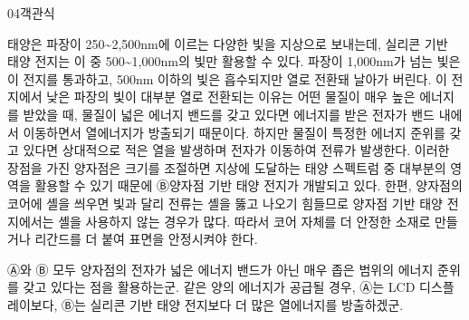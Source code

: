 \documentclass[fs85,seriesWit]{korfarm-base}
\begin{document}
\begin{kfQBlock}{04}{객관식}
\begin{kfEvidence}태양은 파장이 250\textasciitilde{}2,500nm에 이르는 다양한 빛을 지상으로 보내는데, 실리콘 기반 태양 전지는 이 중 500\textasciitilde{}1,000nm의 빛만 활용할 수 있다. 파장이 1,000nm가 넘는 빛은 이 전지를 통과하고, 500nm 이하의 빛은 흡수되지만 열로 전환돼 날아가 버린다. 이 전지에서 낮은 파장의 빛이 대부분 열로 전환되는 이유는 어떤 물질이 매우 높은 에너지를 받았을 때, 물질이 넓은 에너지 밴드를 갖고 있다면 에너지를 받은 전자가 밴드 내에서 이동하면서 열에너지가 방출되기 때문이다. 하지만 물질이 특정한 에너지 준위를 갖고 있다면 상대적으로 적은 열을 발생하며 전자가 이동하여 전류가 발생한다. 이러한 장점을 가진 양자점은 크기를 조절하면 지상에 도달하는 태양 스펙트럼 중 대부분의 영역을 활용할 수 있기 때문에 Ⓑ양자점 기반 태양 전지가 개발되고 있다. 한편, 양자점의 코어에 셸을 씌우면 빛과 달리 전류는 셸을 뚫고 나오기 힘들므로 양자점 기반 태양 전지에서는 셸을 사용하지 않는 경우가 많다. 따라서 코어 자체를 더 안정한 소재로 만들거나 리간드를 더 붙여 표면을 안정시켜야 한다.\end{kfEvidence}
\begin{kfChoices}
\kfChoice Ⓐ와 Ⓑ 모두 양자점의 전자가 넓은 에너지 밴드가 아닌 매우 좁은 범위의 에너지 준위를 갖고 있다는 점을 활용하는군.
\kfChoice 같은 양의 에너지가 공급될 경우, Ⓐ는 LCD 디스플레이보다, Ⓑ는 실리콘 기반 태양 전지보다 더 많은 열에너지를 방출하겠군.
\end{kfChoices}
\end{kfQBlock}
\end{document}
